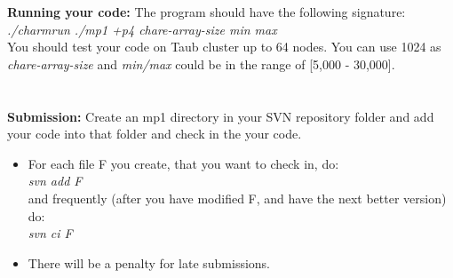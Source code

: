 \documentclass{article}
\begin{document}
\textbf{Running your code:}
The program should have the following signature: \\
\textit{./charmrun ./mp1 +p4 chare-array-size min max} \\

You should test your code on Taub cluster up to 64 nodes. You can use 1024 as
\textit{chare-array-size} and \textit{min/max} could be in the range of [5,000 - 30,000].
\\ \\ \\

\textbf{Submission:}
Create an mp1 directory in your SVN repository folder and add your code into
that folder and check in the your code.
\begin{itemize}
\item  For each file F you create, that you want to check in, do: \\
        \textit{svn add F}\\
        and frequently (after you have modified F, and have the next better
        version) do:\\ 
        \textit{svn ci F}
\item  There will be a penalty for late submissions.
\end{itemize}
\end{document}
